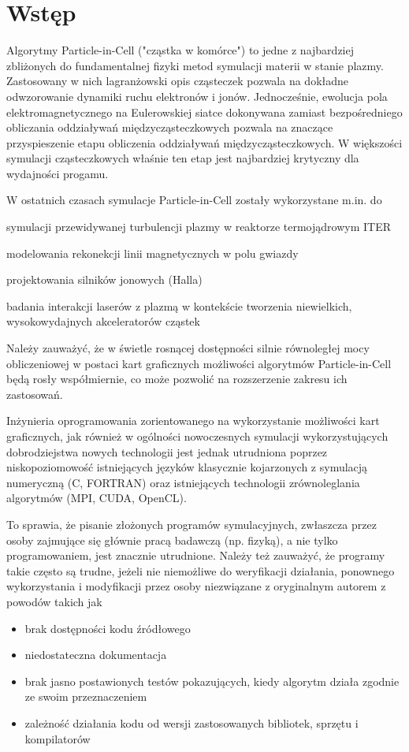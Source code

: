 \newcommand{\code}[1]{\texttt{#1}}

\section[Wstęp]{Wstęp} %
Algorytmy Particle-in-Cell ("cząstka w komórce") to jedne z najbardziej zbliżonych do fundamentalnej fizyki
metod symulacji materii w stanie plazmy. Zastosowany w nich lagranżowski opis cząsteczek pozwala na dokładne
odwzorowanie dynamiki ruchu elektronów i jonów. Jednocześnie, ewolucja pola elektromagnetycznego na Eulerowskiej
siatce dokonywana zamiast bezpośredniego obliczania oddziaływań międzycząsteczkowych pozwala na znaczące
przyspieszenie etapu obliczenia oddziaływań międzycząsteczkowych. W większości symulacji cząsteczkowych właśnie
ten etap jest najbardziej krytyczny dla wydajności progamu.

W ostatnich czasach symulacje Particle-in-Cell zostały wykorzystane m.in. do
\item symulacji przewidywanej turbulencji plazmy w reaktorze termojądrowym ITER %
\item modelowania rekonekcji linii magnetycznych w polu gwiazdy %
\item projektowania silników jonowych (Halla) %
\item badania interakcji laserów z plazmą w kontekście tworzenia niewielkich,
wysokowydajnych akceleratorów cząstek %

Należy zauważyć, że w świetle rosnącej dostępności silnie równoległej mocy obliczeniowej w postaci kart graficznych
możliwości algorytmów Particle-in-Cell będą rosły współmiernie, co może pozwolić na rozszerzenie zakresu ich zastosowań.

Inżynieria oprogramowania zorientowanego na wykorzystanie możliwości kart graficznych,
jak również w ogólności nowoczesnych symulacji wykorzystujących dobrodziejstwa nowych technologii
jest jednak utrudniona poprzez niskopoziomowość istniejących języków klasycznie
kojarzonych z symulacją numeryczną (C, FORTRAN) oraz istniejących technologii zrównoleglania
algorytmów (MPI, CUDA, OpenCL).

To sprawia, że pisanie złożonych programów symulacyjnych, zwłaszcza przez osoby
zajmujące się głównie pracą badawczą (np. fizyką), a nie tylko programowaniem,
jest znacznie utrudnione. Należy też zauważyć, że programy takie często są
trudne, jeżeli nie niemożliwe do weryfikacji działania, ponownego wykorzystania
i modyfikacji przez osoby niezwiązane z oryginalnym autorem z powodów takich jak
\begin{itemize}
    \item brak dostępności kodu źródłowego
    \item niedostateczna dokumentacja
    \item brak jasno postawionych testów pokazujących, kiedy algorytm działa zgodnie ze swoim przeznaczeniem
    \item zależność działania kodu od wersji zastosowanych bibliotek, sprzętu i kompilatorów
\end{itemize}

